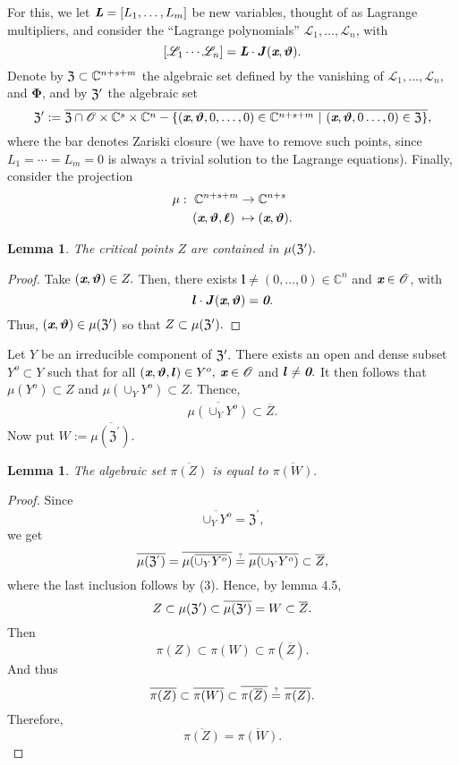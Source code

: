 \documentclass[a4paper]{article}
\newcommand\myeq{\mathrel{\stackrel{\makebox[0pt]{\mbox{\normalfont\tiny ?}}}{=}}}
\def\sO{\mathscr{O}}
\def\fZp{{\mathfrak Z^{'}}}
\def\bz{\textit{\textbf{0}}}
\def\thetab{\bm{\vartheta}}
\def\lb{{\bm l}}
\def\xb{\textit{\textbf{x}}}
\def\vt{\vartheta}
\def\dt{s}
\def\C{\mathbb{C}}
\newtheorem{lemma}[theorem]{Lemma}
\begin{document}
       For this, we let $\textit{\textbf{L}}=[L_1,\hdots,L_m]$ be new
    variables, thought of as Lagrange multipliers, and consider the
    ``Lagrange polynomials'' $\mathscr{L}_1,\dots,\mathscr{L}_{n}$, with
    \[
    [\mathscr{L}_1 \cdots \mathscr{L}_{n}]=\textit{\textbf{L}}\cdot \bm J(\xb,\thetab).
    \] 
    Denote by $\frak{Z} \subset \C^{n+\dt+m}$ the algebraic set defined by
    the vanishing of $\mathscr{L}_1,\hdots,\mathscr{L}_{n},$ and
    $\bm\Phi$, and by $\frak{Z}'$ the algebraic set
    \[
    \frak{Z}' := \overline{\frak{Z} \cap \sO \times \C^s \times \C^n - \{(\xb,\thetab,0,\hdots,0) \in \C^{n+\dt+m}~|~(\xb,\thetab,0\hdots,0) \in \frak{Z}\}},
    \]
    where the bar denotes Zariski closure (we have to remove such points,
    since $L_1=\cdots=L_m=0$ is always a trivial solution to the Lagrange
    equations). Finally, consider the projection
    \begin{align*} 
    \mu :~ \C^{n+\dt+m} &\rightarrow \C^{n+\dt}\\
    (\xb,\thetab,\bm \ell)~ &\mapsto (\xb,\thetab).
    \end{align*}
    \noindent 
    \begin{lemma}
    The critical points $Z$ are contained in $\mu(\frak{Z}').$
    \end{lemma}
    \begin{proof}
    Take $(\xb,\bm \vt) \in Z.$ Then, there exists $\lb \not = (0,\hdots,0) \in \C^n$ and $\xb \in \sO$, with 
    \[
    \lb \cdot \bm J(\xb,\thetab) = \bz.
    \]
    Thus, $(\xb,\bm \vt) \in \mu(\frak{Z}')$ so that $Z \subset \mu(\frak{Z}').$
    \end{proof}
    \noindent
    Let $Y$ be an irreducible component of $\frak{Z}'.$ There exists an open and dense subset $Y^o \subset Y$ such that for all $(\xb,\bm \vt,\lb) \in Y^o,$ $\xb \in \sO$ and $\lb \not = \bz.$ It then follows that 
    $\mu(Y^o) \subset Z$ and $\mu(\cup_Y Y^o) \subset Z.$ Thence, 
    \begin{align}
    \overline{\mu(\cup_Y Y^o)} \subset \overline{Z}.
    \end{align}
    Now put $W := \overline{\mu(\fZp)}$.
    \begin{lemma}
    The algebraic set $\overline{\pi(Z)}$ is equal to $\overline{\pi(W)}.$
    \end{lemma}
    \begin{proof}
    Since 
    \[
    \overline{\cup_Y Y^o} = \fZp,
    \]
    we get 
    \[
    \overline{\mu(\fZp)} = \overline{\mu(\overline{\cup_Y Y^o})}
    \myeq \overline{\mu(\cup_Y Y^o)} \subset \overline{Z},
    \]
    where the last inclusion follows by (3).
    Hence, by lemma 4.5,
    \[
    Z\subset\mu(\frak{Z}')\subset \overline{\mu(\frak{Z}')} = W \subset \overline{Z}.
    \]
    Then 
    \[
    \pi(Z) \subset \pi(W) \subset \pi(\overline{Z}).
    \]
    And thus
    \[
    \overline{\pi(Z)} \subset \overline{\pi(W)} \subset \overline{\pi(\overline{Z})} \myeq\overline{\pi(Z)}.
    \]
    Therefore,
    \[
    \overline{\pi(Z)} = \overline{\pi(W)}.
    \]
    \end{proof}
\end{document}
